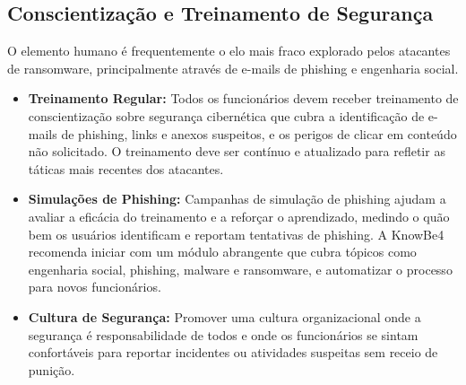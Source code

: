 \subsection{Conscientização e Treinamento de Segurança}
O elemento humano é frequentemente o elo mais fraco explorado pelos atacantes de ransomware, principalmente através de e-mails de phishing e engenharia social.
\begin{itemize}
    \item \textbf{Treinamento Regular:} Todos os funcionários devem receber treinamento de conscientização sobre segurança cibernética que cubra a identificação de e-mails de phishing, links e anexos suspeitos, e os perigos de clicar em conteúdo não solicitado. O treinamento deve ser contínuo e atualizado para refletir as táticas mais recentes dos atacantes.
    \item \textbf{Simulações de Phishing:} Campanhas de simulação de phishing ajudam a avaliar a eficácia do treinamento e a reforçar o aprendizado, medindo o quão bem os usuários identificam e reportam tentativas de phishing. A KnowBe4 recomenda iniciar com um módulo abrangente que cubra tópicos como engenharia social, phishing, malware e ransomware, e automatizar o processo para novos funcionários.
    \item \textbf{Cultura de Segurança:} Promover uma cultura organizacional onde a segurança é responsabilidade de todos e onde os funcionários se sintam confortáveis para reportar incidentes ou atividades suspeitas sem receio de punição.
\end{itemize}

